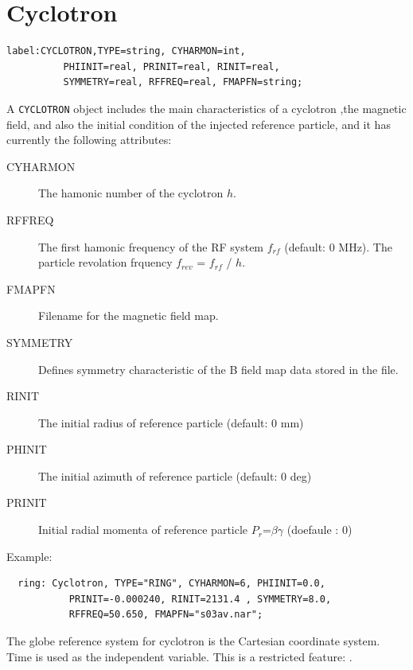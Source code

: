 \section{Cyclotron}
\label{sec:cyclotron}
\begin{verbatim}
label:CYCLOTRON,TYPE=string, CYHARMON=int, 
          PHIINIT=real, PRINIT=real, RINIT=real, 
          SYMMETRY=real, RFFREQ=real, FMAPFN=string;
\end{verbatim}
A \texttt{CYCLOTRON} object includes the main characteristics of a cyclotron ,the magnetic field, 
 and also the initial condition of the injected reference particle, and it has currently the following attributes:
\begin{description}
\item[CYHARMON]
  The hamonic number of the cyclotron $h$. 
\item[RFFREQ]
  The first hamonic frequency of the RF system $f_{rf}$  (default: 0 MHz).
  The particle revolation frquency $f_{rev}$ =  $f_{rf}$ / $h$.
\item[FMAPFN]
  Filename for the magnetic field map. 
\item[SYMMETRY]
  Defines symmetry characteristic of the B field map data stored in the file.  
\item[RINIT]
  The initial radius of reference particle (default: 0 mm)
\item[PHINIT]
  The initial azimuth of reference particle (default: 0 deg)
\item[PRINIT]
  Initial radial momenta of reference particle $P_r$=$\beta$$\gamma$ (doefaule : 0)
\end{description}
\noindent Example:
\begin{verbatim}
  ring: Cyclotron, TYPE="RING", CYHARMON=6, PHIINIT=0.0, 
           PRINIT=-0.000240, RINIT=2131.4 , SYMMETRY=8.0, 
           RFFREQ=50.650, FMAPFN="s03av.nar";
\end{verbatim}
The globe reference system for cyclotron is the Cartesian coordinate system.
Time is used as the  independent variable.
This is a restricted feature: \opalcycl .
